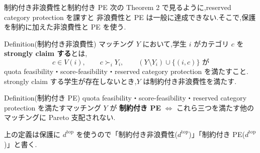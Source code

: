 \documentclass[aspectratio=43,11pt]{beamer}
\newcommand{\topf}{\mathrm{top}}
\newcommand{\dtop}[1]{d^{\topf}_{#1}}
\begin{document}

\begin{frame}{制約付き非浪費性と制約付き PE}
\small
次の Theorem 2 で見るように,reserved category protection を課すと
非浪費性と PE は一般に達成できない.そこで,保護を制約に加えた非浪費性と PE を使う.
\begin{block}{Definition(制約付き非浪費性)}
  マッチング $Y$ において,学生 $i$ がカテゴリ $c$ を \textbf{strongly claim する}とは,
  \[
    c \in V(i), \qquad c \succ_i Y_i, \qquad
    (Y \setminus Y_i) \cup \{(i,c)\} \text{ が}
  \]
  quota feasibility・score-feasibility・reserved category protection
  を満たすこと.
  \\ strongly claim する学生が存在しないとき,$Y$ は制約付き非浪費性を満たす.
\end{block}
\begin{block}{Definition(制約付き PE)}
  quota feasibility・score-feasibility・reserved category protection を満たすマッチング $Y$ が
  \textbf{制約付き PE} $\iff$
  これら三つを満たす他のマッチングに Pareto 支配されない.
\end{block}
{\footnotesize
上の定義は保護に $\dtop{}$ を使うので「制約付き非浪費性($\dtop{}$)」「制約付き PE($\dtop{}$)」と書く.}
\end{frame}
\end{document}

